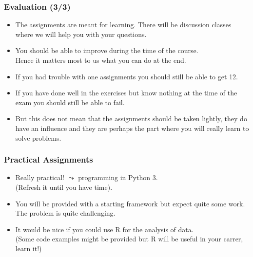 \documentclass[handout,usepdftitle=false,aspectratio=169,smaller,compress,sans,fleqn,xcolor=dvipsnames,fleqn,table]{beamer}
\begin{document}
\begin{frame}%
  \frametitle{Evaluation (3/3)}
  
\begin{itemize}\itemsep=3ex
    \item The assignments are meant for learning. There will be
      discussion classes where we will help you with your questions.
    \item You should be able to improve during the time of the course.\\
Hence it matters most to us what you can do at the end.
\item If you had trouble with one assignments you should still be able to get 12.
\item If you have done well in the exercises but know nothing at the
  time of the exam you should still be able to fail.
\item But this does not mean that the assignments should be taken
  lightly, they do have an influence and they are perhaps the part where
  you will really learn to solve problems.
\end{itemize}
\end{frame}

\begin{frame}%
  \frametitle{Practical Assignments}

  \medskip\begin{itemize}\itemsep=3ex
    \item  Really practical! $\leadsto$ programming in Python 3.\\
 (Refresh it until you have time).

\item You will be provided with a starting framework but expect quite
  some work. The problem is quite challenging.


\item It would be nice if you could use R for the analysis of
  data.\\ (Some code examples might be provided but R will be useful in
  your carrer, learn it!)
 
\end{itemize}
\end{frame}
\end{document}
